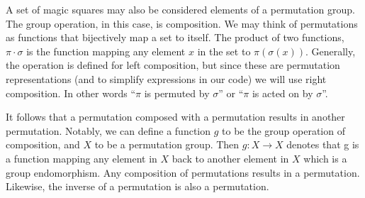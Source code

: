 \documentclass{rhumj_new}
\begin{document}


A set of magic squares may also be considered elements of a permutation group. The group operation,
in this case, is composition. We may think of permutations as functions that bijectively map a set
to itself. The product of two functions, $\pi\cdot\sigma$ is the function mapping any element $x$
in the set to $\pi\left(\sigma\left(x\right)\right)$. Generally, the operation is defined for left
composition, but since these are permutation representations (and to simplify expressions in our
code) we will use right composition. In other words ``$\pi$ is permuted by $\sigma$'' or ``$\pi$ is
acted on by $\sigma$''.

It follows that a permutation composed with a permutation results in another permutation. Notably,
we can define a function $g$ to be the group operation of composition, and $X$ to be a permutation
group. Then $g:X\rightarrow X$ denotes that g is a function mapping any element in $X$ back to
another element in $X$ which is a group endomorphism. Any composition of permutations results in a
permutation\cite{Deskins}. Likewise, the inverse of a permutation is also a
permutation\cite{Deskins}.


\end{document}
